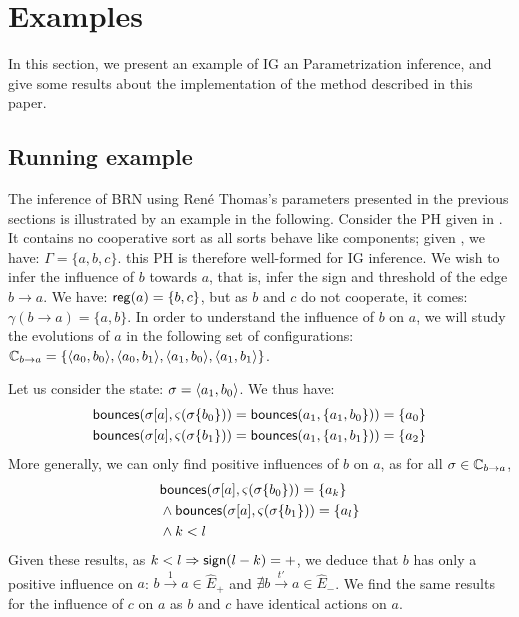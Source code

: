 \section{Examples}

In this section, we present an example of IG an Parametrization inference, and give some results about the implementation of the method described in this paper.

\subsection{Running example}
The inference of BRN using René Thomas's parameters presented in the previous sections is illustrated by an example in the following.
Consider the PH given in .
It contains no cooperative sort as all sorts behave like components; given , we have: $\Gamma = \{a, b, c\}$.
this PH is therefore well-formed for IG inference.
We wish to infer the influence of $b$ towards $a$, that is, infer the sign and threshold of the edge $b \rightarrow a$.
We have: $\mathsf{reg}({a}) = \{b, c\}$, but as $b$ and $c$ do not cooperate, it comes: $\gamma(b \rightarrow a) = \{a, b\}$.
In order to understand the influence of $b$ on $a$, we will study the evolutions of $a$ in the following set of configurations: $\mathbb C_{b\rightarrow a} = \{\mbox{$\langle a_0, b_0 \rangle$}, \mbox{$\langle a_0, b_1 \rangle$}, \mbox{$\langle a_1, b_0 \rangle$}, \mbox{$\langle a_1, b_1 \rangle$}\}$.

Let us consider the state: $\sigma = \mbox{$\langle a_1, b_0 \rangle$}$. We thus have:
\begin{align*}
\mathsf{bounces}({\sigma[a]},\varsigma(\sigma\{b_0\})) &= \mathsf{bounces}(a_1,\{a_1, b_0\})) = \{a_0\} \\
\mathsf{bounces}({\sigma[a]},\varsigma(\sigma\{b_1\})) &= \mathsf{bounces}(a_1,\{a_1, b_1\})) = \{a_2\}
\end{align*}
More generally, we can only find positive influences of $b$ on $a$, as for all $\sigma \in \mathbb C_{b\rightarrow a}$,
\begin{align*}
&\mathsf{bounces}({\sigma[a]},\varsigma(\sigma\{b_0\})) = \{a_k\} \\
&\wedge \mathsf{bounces}({\sigma[a]},\varsigma(\sigma\{b_1\})) = \{a_l\} \\
&\wedge k < l
\end{align*}
Given these results, as $k < l \Rightarrow \mathsf{sign}(l - k) = +$, we deduce that $b$ has only a positive influence on $a$:
$b \xrightarrow{1} a \in \hat{E}_+$ and $\nexists b \xrightarrow{t'} a \in \hat{E}_-$.
We find the same results for the influence of $c$ on $a$ as $b$ and $c$ have identical actions on $a$.

